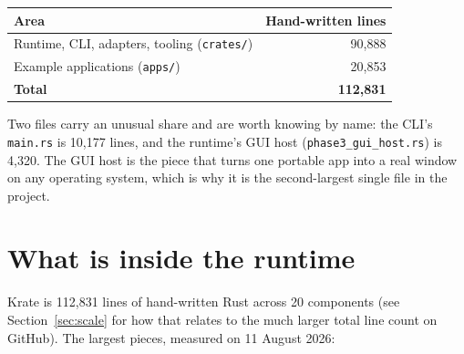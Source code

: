 \documentclass[11pt,a4paper]{report}
\begin{document}
\begin{center}
\begin{tabular}{lr}
\toprule
\textbf{Area} & \textbf{Hand-written lines} \\
\midrule
Runtime, CLI, adapters, tooling (\texttt{crates/}) & 90{,}888 \\
Example applications (\texttt{apps/}) & 20{,}853 \\
\midrule
\textbf{Total} & \textbf{112{,}831} \\
\bottomrule
\end{tabular}
\end{center}

Two files carry an unusual share and are worth knowing by name: the CLI's
\texttt{main.rs} is 10{,}177 lines, and the runtime's GUI host
(\texttt{phase3\_gui\_host.rs}) is 4{,}320. The GUI host is the piece that
turns one portable app into a real window on any operating system, which is
why it is the second-largest single file in the project.

\section{What is inside the runtime}

Krate is 112{,}831 lines of hand-written Rust across 20 components (see
Section~\ref{sec:scale} for how that relates to the much larger total line
count on GitHub). The largest pieces,
measured on 11 August 2026:
\end{document}
